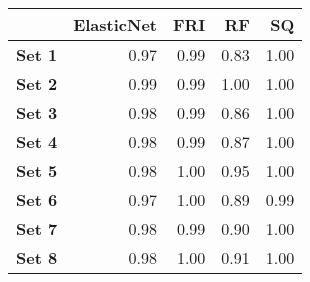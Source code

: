 \begin{tabular}{lrrrr}
\toprule
{} &  ElasticNet &  FRI &   RF &   SQ \\
\midrule
\textbf{Set 1} &        0.97 & 0.99 & 0.83 & 1.00 \\
\textbf{Set 2} &        0.99 & 0.99 & 1.00 & 1.00 \\
\textbf{Set 3} &        0.98 & 0.99 & 0.86 & 1.00 \\
\textbf{Set 4} &        0.98 & 0.99 & 0.87 & 1.00 \\
\textbf{Set 5} &        0.98 & 1.00 & 0.95 & 1.00 \\
\textbf{Set 6} &        0.97 & 1.00 & 0.89 & 0.99 \\
\textbf{Set 7} &        0.98 & 0.99 & 0.90 & 1.00 \\
\textbf{Set 8} &        0.98 & 1.00 & 0.91 & 1.00 \\
\bottomrule
\end{tabular}
